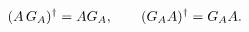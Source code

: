 \begin{equation}
(A\,G_A)\sp\dagger=AG_A,\quad\quad (G_AA)\sp\dagger=G_AA .
\label{MP}
\end{equation}

